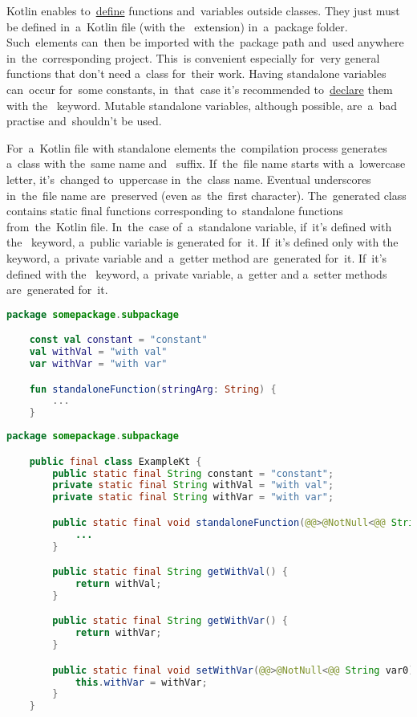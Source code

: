 \label{kotlinstandalone}
Kotlin enables to~\hyperref[declarationdefinition]{define} functions and~variables outside classes.
They just must be defined in~a~Kotlin file (with \mbox{the } extension) in~a~package folder.
Such~elements can~then be imported with the~package path and~used anywhere in~the~corresponding project.
This~is convenient especially for~very general functions that don't need a~class for~their work.
Having standalone variables can~occur for~some constants, in~that~case it's recommended to~\hyperref[declarationdefinition]{declare} them with \mbox{the } keyword.
Mutable standalone variables, although possible, are~a~bad practise and~shouldn't be used.

For~a~Kotlin file with standalone elements the~compilation process generates a~class with the~same name \mbox{and } suffix.
If~the~file name starts with a~lowercase letter, it's~changed to~uppercase in~the~class name.
Eventual underscores in~the~file name are~preserved (even as~the~first character).
The~generated class contains static final functions corresponding to~standalone functions from~the~Kotlin file.
In~the~case of~a~standalone variable, if~it's defined with \mbox{the } keyword, a~public variable is generated for~it.
If~it's defined only with \mbox{the } keyword, a~private variable and~a~getter method are~generated for~it.
If~it's defined with \mbox{the } keyword, a~private variable, a~getter and a~setter methods are~generated for~it.

\example
\begin{lstlisting}[language=Kotlin, title={Kotlin file \itq{Example.kt} with standalone elements}]
    package somepackage.subpackage

    const val constant = "constant"
    val withVal = "with val"
    var withVar = "with var"

    fun standaloneFunction(stringArg: String) {
        ...
    }
\end{lstlisting}

\begin{lstlisting}[language=Java, title={Java equivalent}]
    package somepackage.subpackage

    public final class ExampleKt {
        public static final String constant = "constant";
        private static final String withVal = "with val";
        private static final String withVar = "with var";

        public static final void standaloneFunction(@@>@NotNull<@@ String stringArg) {
            ...
        }

        public static final String getWithVal() {
            return withVal;
        }

        public static final String getWithVar() {
            return withVar;
        }

        public static final void setWithVar(@@>@NotNull<@@ String var0) {
            this.withVar = withVar;
        }
    }
\end{lstlisting}
\newpage

